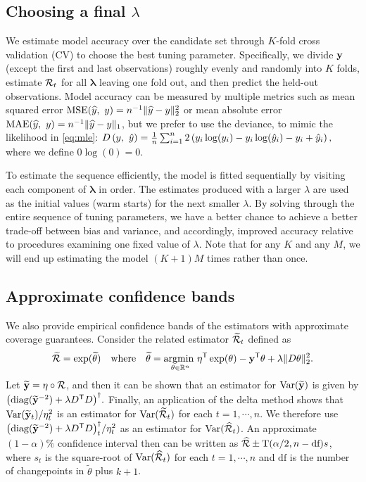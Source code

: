 \subsection{Choosing a final $\lambda$}
\label{sec:cv}

We estimate model accuracy over the candidate set through $K$-fold cross
validation (CV) to choose the best tuning parameter. Specifically, we divide
$\mathbf{y}$ (except the first and last observations) roughly evenly and randomly into
$K$ folds, estimate $\mathcal{R}_t$ for all $\boldsymbol{\lambda}$ leaving one fold
out, and then predict the held-out observations. Model accuracy can be measured
by multiple metrics such as mean squared error $\mathrm{MSE}(\widehat{y},\ y) =
n^{-1}\lVert \widehat{y} - y \rVert_2^2$ or mean absolute error
$\mathrm{MAE}(\widehat{y},\ y) = n^{-1}\lVert \widehat{y} - y \rVert_1$, but we prefer
to use the deviance, to mimic the likelihood in \autoref{eq:mle}: $D\left(y,\
\hat{y}\right) = \frac{1}{n} \sum_{i=1}^n 2\left(y_i \log(y_i) - y_i\log(\hat{y}_i) - y_i +
\hat{y}_i\right),$ where we define $0\log(0) = 0$. 

To estimate the sequence efficiently, the model is fitted sequentially by visiting each component 
of $\boldsymbol{\lambda}$ in order. The estimates produced with a larger 
$\lambda$ are used as the initial values (warm starts) for the next smaller $\lambda$. 
By solving through the entire sequence of tuning parameters, we have a better chance to 
achieve a better trade-off between bias and variance, and accordingly, improved
accuracy relative to procedures examining one fixed value of $\lambda$. Note
that for any $K$ and any $M$, we will end up estimating the model $(K+1)M$
times rather than once.


\subsection{Approximate confidence bands} 
\label{sec:conf-band} 

We also provide empirical confidence bands of the estimators with  
approximate coverage guarantees. 
Consider the related estimator $\widetilde{\mathcal{R}}_t$ defined as
$$\widetilde{\mathcal{R}} = \exp(\widetilde{\theta}) \quad\textrm{where}\quad
\widetilde{\theta} = \underset{\theta\in\mathbb{R}^n}{\operatorname*{argmin}\ } \eta^{\mathsf{T}} \exp(\theta) - \mathbf{y}^{\mathsf{T}}
\theta + \lambda \lVert D \theta \rVert_2^2.$$ 
Let $\widetilde{\mathbf{y}} = \eta \circ \mathcal{R}$, and then it can be shown \citep[for example,
Theorem 2 in][]{vaiter2017degrees} that an estimator for
$\mathrm{Var}(\widetilde{\mathbf{y}})$ is given by $\big(\mathrm{diag}(\widetilde{\mathbf{y}}^{-2})
+ \lambda D^{\mathsf{T}} D\big)^{\dagger}.$ Finally, an
application of the delta method shows that $\mathrm{Var}(\widetilde{\mathbf{y}}_t) / \eta_t^2$
is an estimator for $\mathrm{Var}(\widetilde{\mathcal{R}}_t)$ for each $t = 1, \cdots, n$. We
therefore use $\big(\mathrm{diag}(\widetilde{\mathbf{y}}^{-2}) + \lambda
D^{\mathsf{T}} D\big)^{\dagger}_t / \eta_t^2$ as an estimator
for $\mathrm{Var}(\widehat{\mathcal{R}}_t)$. An approximate $(1-\alpha)\%$ confidence interval
then can be written as $\widehat{\mathcal{R}} \pm \textrm{T}(\alpha/2, n-\textrm{df}) s$, where $s_t$ is
the square-root of $\mathrm{Var}(\widehat{\mathcal{R}}_t)$ for each $t = 1, \cdots, n$ and $\textrm{df}$ is
the number of changepoints in $\widetilde{\theta}$ plus $k+1$. 

